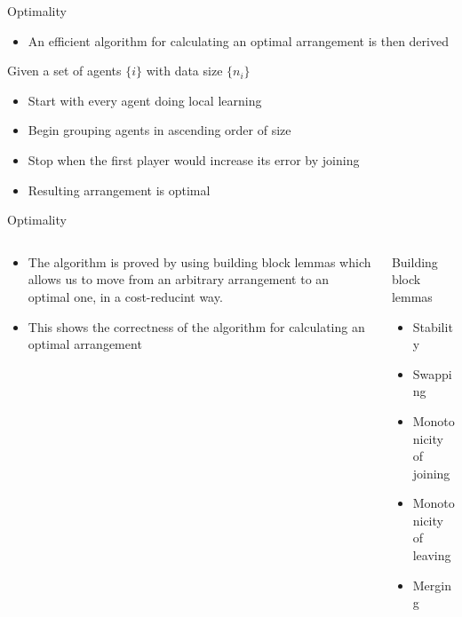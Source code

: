 \documentclass[aspectratio=169]{beamer}
\begin{document}
\begin{frame}[label={sec:org73a30ce}]{Optimality}
\begin{itemize}
\item An efficient algorithm for calculating an optimal arrangement is then derived
\end{itemize}
\begin{theorem}[Algorithm]\label{sec:orgfd9fe4b}
Given a set of agents \(\{i\}\) with data size \(\{ n_i \}\)
\begin{itemize}
\item Start with every agent doing local learning
\item Begin grouping agents in ascending order of size
\item Stop when the first player would increase its error by joining
\item Resulting arrangement is optimal
\end{itemize}
\end{theorem}
\end{frame}

\begin{frame}[label={sec:orgb798a08}]{Optimality}
\begin{columns}
\begin{column}{0.5\columnwidth}
\begin{itemize}
\item The algorithm is proved by using building block lemmas which allows us to move from an arbitrary arrangement to an optimal one, in a cost-reducint way.
\item This shows the correctness of the algorithm for calculating an optimal arrangement
\end{itemize}
\end{column}

\begin{column}{0.4\columnwidth}
\begin{block}{Building block lemmas}
\begin{itemize}
\item Stability
\item Swapping
\item Monotonicity of joining
\item Monotonicity of leaving
\item Merging
\end{itemize}
\end{block}
\end{column}
\end{columns}
\end{frame}
\end{document}

